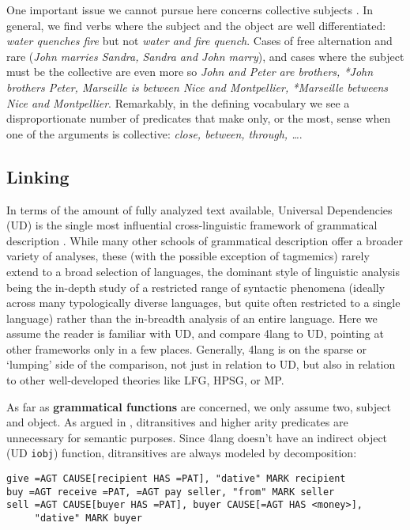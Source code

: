 \documentclass[11pt,bookmarks,bookmarksnumbered,naturalnames,plainpages=false,pdftex,colorlinks=true,urlcolor=blue,bookmarksdepth=subsection,plainpages=false]{paper}
\begin{document}
One important issue we cannot pursue here concerns collective subjects
\citep{Scha:1981}. In general, we find verbs where the subject and the object
are well differentiated: {\it water quenches fire} but not {\it *water and
  fire quench}. Cases of free alternation and rare ({\it John marries Sandra,
  Sandra and John marry}), and cases where the subject must be the collective
are even more so {\it John and Peter are brothers, *John brothers Peter,
  Marseille is between Nice and Montpellier, *Marseille betweens Nice and
  Montpellier}. Remarkably, in the defining vocabulary we see a
disproportionate number of predicates that make only, or the most, sense when
one of the arguments is collective: {\it close, between, through, \ldots}. 






\subsection{Linking}\label{linking}

In terms of the amount of fully analyzed text available, Universal
Dependencies (UD) is the single most influential cross-linguistic framework of
grammatical description \citep{Nivre:2018s}. While many other schools of
grammatical description offer a broader variety of analyses, these (with the
possible exception of tagmemics) rarely extend to a broad selection of
languages, the dominant style of linguistic analysis being the in-depth study
of a restricted range of syntactic phenomena (ideally across many
typologically diverse languages, but quite often restricted to a single
language) rather than the in-breadth analysis of an entire language. Here we
assume the reader is familiar with UD, and compare 4lang to UD, pointing at
other frameworks only in a few places. Generally, 4lang is on the sparse or
`lumping' side of the comparison, not just in relation to UD, but also in
relation to other well-developed theories like LFG, HPSG, or MP.

As far as {\bf grammatical functions} are concerned, we only assume two,
subject and object. As argued in \citep{Kornai:2012}, ditransitives and higher
arity predicates are unnecessary for semantic purposes. Since 4lang doesn't
have an indirect object (UD {\tt iobj}) function, ditransitives are always
modeled by decomposition:

\begin{verbatim}
give =AGT CAUSE[recipient HAS =PAT], "dative" MARK recipient
buy =AGT receive =PAT, =AGT pay seller, "from" MARK seller
sell =AGT CAUSE[buyer HAS =PAT], buyer CAUSE[=AGT HAS <money>], 
     "dative" MARK buyer
\end{verbatim}
\end{document}
